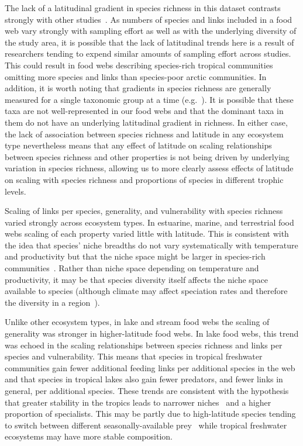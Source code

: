 \documentclass[12pt]{article}
\begin{document}
  The lack of a latitudinal gradient in species richness in this dataset contrasts
  strongly with other studies~\citep{Schemske2009a,Macpherson2002,Kaufman1995}. As numbers of species and links included in a food web
  vary strongly with sampling effort as well as with the underlying diversity of the study
  area, it is possible that the lack of latitudinal trends here is a result of researchers
  tending to expend similar amounts of sampling effort across studies. This could result in
  food webs describing species-rich tropical communities omitting more species and links
  than species-poor arctic communities. In addition, it is worth noting that gradients in
  species richness are generally measured for a single taxonomic group at a time (e.g.~\citep{Kaufman1995}).
  It is possible that these taxa are not well-represented in our food webs and that the
  dominant taxa in them do not have an underlying latitudinal gradient in richness. In
  either case, the lack of association between species richness
  and latitude in any ecosystem type nevertheless means that any effect of latitude on scaling relationships
  between species richness and other properties is not being driven by underlying variation in
  species richness, allowing us to more clearly assess effects of latitude on scaling with 
  species richness and proportions of species in different trophic levels.


  Scaling of links per species, generality, and vulnerability with species
  richness varied strongly across ecosystem types. In estuarine, marine, and
  terrestrial food webs scaling of each property varied little with latitude.
  This is consistent with the idea that species' niche breadths do not vary
  systematically with temperature and productivity but that the niche space
  might be larger in species-rich communities~\citep{Davies2007}. Rather than
  niche space depending on temperature and productivity, it may be that species
  diversity itself affects the niche space available to species (although climate
  may affect speciation rates and therefore the diversity in a region~\citep{Currie2004}).


  Unlike other ecosystem types, in lake and stream food webs 
  the scaling of generality was stronger in higher-latitude food webs. 
  In lake food webs, this trend was echoed in the scaling relationships
  between species richness and links per species and vulnerability.
  This means that species in tropical freshwater
  communities gain fewer additional feeding links per additional species in the
  web and that species in tropical lakes also gain fewer predators, and fewer links
  in general, per additional species. These trends are consistent with the hypothesis
  that greater stability in the tropics leads to narrower niches~\citep{Brown2004} and a higher proportion of
  specialists. This may be partly due to high-latitude species
  tending to switch between different seasonally-available
  prey~\citep{Isaac2012,Wilhelm1999} while tropical freshwater ecosystems may have more stable composition.
\end{document}
